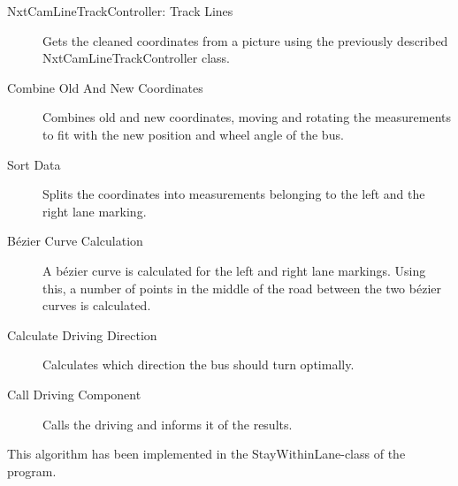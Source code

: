 \begin{description}
    \item[NxtCamLineTrackController: Track Lines]
    Gets the cleaned coordinates from a picture using the previously described NxtCamLineTrackController class. 
    \item[Combine Old And New Coordinates]
    Combines old and new coordinates, moving and rotating the measurements to fit with the new position and wheel angle of the bus. 
    \item[Sort Data]
    Splits the coordinates into measurements belonging to the left and the right lane marking. 
    \item[Bézier Curve Calculation]
    A bézier curve is calculated for the left and right lane markings. Using this, a number of points in the middle of the road between the two bézier curves is calculated.
    \item[Calculate Driving Direction]
    Calculates which direction the bus should turn optimally. 
    \item[Call Driving Component]
    Calls the driving and informs it of the results.
\end{description}

This algorithm has been implemented in the StayWithinLane-class of the program. 


